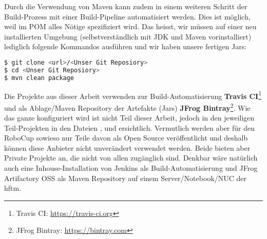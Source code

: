 Durch die Verwendung von Maven kann zudem in einem weiteren Schritt der Build-Prozess mit einer Build-Pipeline automatisiert werden. Dies ist möglich, weil im POM alles Nötige spezifiziert wird. Das heisst, wir müssen auf einer neu installierten Umgebung (selbstverständlich mit JDK und Maven vorinstalliert) lediglich folgende Kommandos ausführen und wir haben unsere fertigen Jars:
\begin{lstlisting}[language={bash}]
$ git clone <url>/<Unser Git Reposiory>
$ cd <Unser Git Reposiory>
$ mvn clean package
\end{lstlisting}
Die Projekte aus dieser Arbeit verwenden zur Build-Automatisierung \textbf{Travis CI}\footnote{Travis CI: \url{https://travis-ci.org}} und als Ablage/Maven Repository der Artefakte (Jars) \textbf{JFrog Bintray}\footnote{JFrog Bintray: \url{https://bintray.com}}. Wie das ganze konfiguriert wird ist nicht Teil dieser Arbeit, jedoch in den jeweiligen Teil-Projekten in den Dateien ,  und  ersichtlich. Vermutlich werden aber für den RoboCup sowieso nur Teile davon als Open Source veröffentlicht und deshalb können diese Anbieter nicht unverändert verwendet werden. Beide bieten aber Private Projekte an, die nicht von allen zugänglich sind. Denkbar wäre natürlich auch eine Inhouse-Installation von Jenkins als Build-Automatisierung und JFrog Artifactory OSS als Maven Repository auf einem Server/Notebook/NUC der \acrshort{hftm}.

